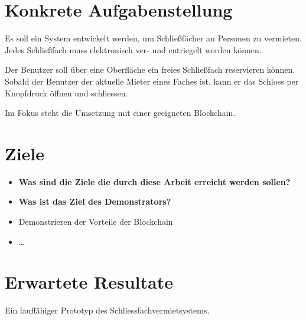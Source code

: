 \section{Konkrete Aufgabenstellung}
\label{sec:Konkrete Aufgabenstellung}
Es soll ein System entwickelt werden, um Schließfächer an Personen zu vermieten. Jedes Schließfach muss elektronisch ver- und entriegelt werden können.

Der Benutzer soll über eine Oberfläche ein freies Schließfach reservieren können. Sobald der Benutzer der aktuelle Mieter eines Faches ist, kann er das Schloss per Knopfdruck öffnen und schliessen.

Im Fokus steht die Umsetzung mit einer geeigneten Blockchain.

\section{Ziele}
\label{sec:Ziele}
\begin{itemize}
    \item \textbf{ Was sind die Ziele die durch diese Arbeit erreicht werden sollen? }
    \item \textbf{ Was ist das Ziel des Demonstrators? }
\end{itemize}

\begin{itemize}
    \item Demonstrieren der Vorteile der Blockchain
    \item \dots
\end{itemize}


\section{Erwartete Resultate}
\label{sec:Erwartete_Resultate}

Ein lauffähiger Prototyp des Schliessfachvermietsystems.